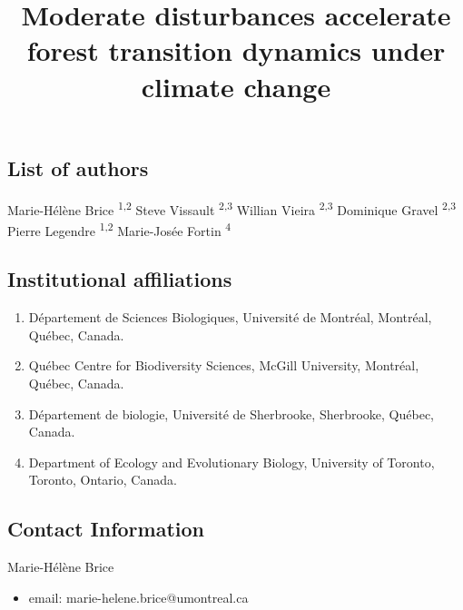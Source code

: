 \documentclass[a4paperpaper,]{article}
\title{Moderate disturbances accelerate forest transition dynamics under
climate change}
\date{}
\providecommand{\tightlist}{%
  \setlength{\itemsep}{0pt}\setlength{\parskip}{0pt}}
\begin{document}
\maketitle

\hypertarget{list-of-authors}{%
\subsection*{List of authors}\label{list-of-authors}}

Marie-Hélène Brice \textsuperscript{1,2} Steve Vissault
\textsuperscript{2,3} Willian Vieira \textsuperscript{2,3} Dominique
Gravel \textsuperscript{2,3} Pierre Legendre \textsuperscript{1,2}
Marie-Josée Fortin \textsuperscript{4}

\hypertarget{institutional-affiliations}{%
\subsection*{Institutional
affiliations}\label{institutional-affiliations}}

\begin{enumerate}
\def\labelenumi{\arabic{enumi}.}
\tightlist
\item
  Département de Sciences Biologiques, Université de Montréal, Montréal,
  Québec, Canada.
\item
  Québec Centre for Biodiversity Sciences, McGill University, Montréal,
  Québec, Canada.
\item
  Département de biologie, Université de Sherbrooke, Sherbrooke, Québec,
  Canada.
\item
  Department of Ecology and Evolutionary Biology, University of Toronto,
  Toronto, Ontario, Canada.
\end{enumerate}

\hypertarget{contact-information}{%
\subsection*{Contact Information}\label{contact-information}}

Marie-Hélène Brice

\begin{itemize}
\tightlist
\item
  email: marie-helene.brice@umontreal.ca
\end{itemize}
\end{document}

